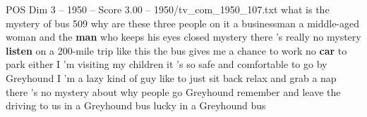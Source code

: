 \begin{textsample}{POS Dim 3 – 1950 – Score 3.00 – 1950/tv\_com\_1950\_107.txt}  \label{ex:f3_pos_018}
what is the mystery of bus 509 why are these three people on it a businessman a middle-aged woman and the \textbf{man} who keeps his eyes closed mystery there 's really no mystery \textbf{listen} on a 200-mile trip like this the bus gives me a chance to work no \textbf{car} to park either I 'm visiting my children it 's so safe and comfortable to go by Greyhound I 'm a lazy kind of guy like to just sit back relax and grab a nap there 's no mystery about why people go Greyhound remember and leave the driving to us in a Greyhound bus lucky in a Greyhound bus

\end{textsample}
